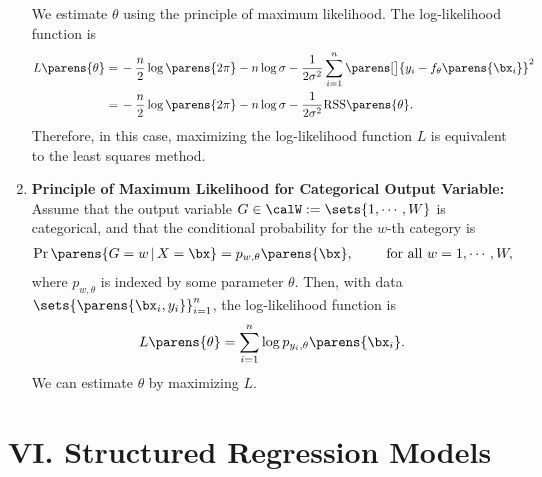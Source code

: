 \documentclass[12pt]{article}
\begin{document}
\begin{enumerate}[label=\textbf{\arabic*.}]
	We estimate $\theta$ using the principle of maximum likelihood. The log-likelihood function is 
	\begin{align*}
		L \parens{\theta} = & \, - \frac{n}{2} \log \parens{2 \pi} - n \log \sigma - \frac{1}{2\sigma^2} \sum_{i=1}^n \parens[\big]{y_i - f_{\theta}\parens{\bx_i}}^2 \\ 
		= & \, - \frac{n}{2} \log \parens{2 \pi} - n \log \sigma - \frac{1}{2\sigma^2} \mathrm{RSS} \parens{\theta}. 
	\end{align*}
	Therefore, in this case, maximizing the log-likelihood function $L$ is equivalent to the least squares method. 
	
	\item \textbf{Principle of Maximum Likelihood for Categorical Output Variable:} Assume that the output variable $G \in \calW := \sets{1, \cdots, W}$ is categorical, and that the conditional probability for the $w$-th category is 
	\begin{align*}
		\Pr \parens{G = w \,\vert\, X = \bx} = p_{w, \theta} \parens{\bx}, \qquad \text{ for all } w = 1, \cdots, W, 
	\end{align*}
	where $p_{w, \theta}$ is indexed by some parameter $\theta$. Then, with data $\sets{\parens{\bx_i, y_i}}_{i=1}^n$, the log-likelihood function is 
	\begin{align*}
		L \parens{\theta} = \sum_{i=1}^n \log p_{y_i, \theta} \parens{\bx_i}. 
	\end{align*}
	We can estimate $\theta$ by maximizing $L$. 
	
\end{enumerate}

\section*{VI. Structured Regression Models}
\end{document}

